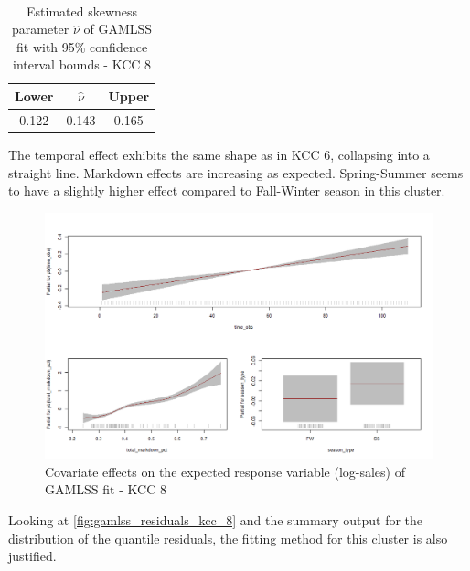 \begin{table}[H]
\setlength\arrayrulewidth{1pt}  
\centering
\begin{adjustbox}{max width=\textwidth}\
\begin{tabular}{|c|c|c|}
\hline
\rowcolor{lightgray} 
Lower & $\hat{\nu}$ & Upper \\ \hline
0.122        & 0.143           & 0.165        \\ \hline
\end{tabular}
\end{adjustbox}
\caption{Estimated skewness parameter $\hat{\nu}$ of GAMLSS fit with 95\% confidence interval bounds - KCC 8}
\label{tab:nu_ci_kcc_8}
\end{table}



The temporal effect exhibits the same shape as in \ac{KCC} 6, collapsing into a straight line. Markdown effects are increasing as expected. Spring-Summer seems to have a slightly higher effect compared to Fall-Winter season in this cluster.
\\


\begin{figure}[H]
\centering
  \includegraphics[width=0.95\linewidth]{figures/gamlss_effects_kcc_8.png}
  \caption{Covariate effects on the expected response variable (log-sales) of GAMLSS fit - KCC 8}
  \label{fig:gamlss_effects_kcc_8}
\end{figure}



Looking at \autoref{fig:gamlss_residuals_kcc_8} and the summary output for the distribution of the quantile residuals, the fitting method for this cluster is also justified.


